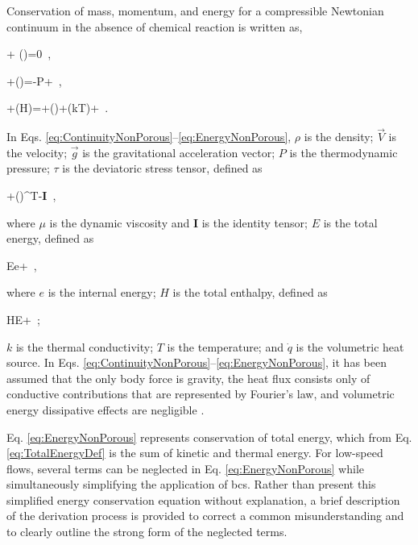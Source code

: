 Conservation of mass, momentum, and energy for a compressible Newtonian continuum in the absence of chemical reaction is written as,

\beq
\label{eq:ContinuityNonPorous}
 + \nabla\cdot(\rho{})=0\ ,
\eeq

\beq
\label{eq:NSFullForm}
+\nabla\cdot(\rho{})=\rho{}-\nabla P+\nabla\cdot\tau\ ,
\eeq

\beq
\label{eq:EnergyNonPorous}
+\nabla\cdot(\rho H)=\rho {}\cdot{}+\nabla\cdot(\tau)+\nabla\cdot(k\nabla T)+\ .
\eeq

\noindent In Eqs. \eqref{eq:ContinuityNonPorous}--\eqref{eq:EnergyNonPorous}, \(\rho\) is the density; \(\vec{V}\) is the velocity; \(\vec{g}\) is the gravitational acceleration vector; \(P\) is the thermodynamic pressure; \(\tau\) is the deviatoric stress tensor, defined as

\beq
\label{eq:TauDef}
\tau\equiv\mu\left\lbrack\nabla {}+(\nabla {})^T\right\rbrack-\nabla\cdot{}\textbf{I}\ ,
\eeq

\noindent where \(\mu\) is the dynamic viscosity and \(\textbf{I}\) is the identity tensor; \(E\) is the total energy, defined as

\beq
\label{eq:TotalEnergyDef}
E\equiv e+\cdot{}\ ,
\eeq

\noindent where \(e\) is the internal energy; \(H\) is the total enthalpy, defined as

\beq
\label{eq:TotalEnthalpyDef}
H\equiv E+\ ;
\eeq

\noindent \(k\) is the thermal conductivity; \(T\) is the temperature; and \(\dot{q}\) is the volumetric heat source. In Eqs. \eqref{eq:ContinuityNonPorous}--\eqref{eq:EnergyNonPorous}, it has been assumed that the only body force is gravity, the heat flux consists only of conductive contributions that are represented by Fourier's law, and volumetric energy dissipative effects are negligible \cite{batchelor}.

Eq. \eqref{eq:EnergyNonPorous} represents conservation of total energy, which from Eq. \eqref{eq:TotalEnergyDef} is the sum of kinetic and thermal energy. For low-speed flows, several terms can be neglected in Eq. \eqref{eq:EnergyNonPorous} while simultaneously simplifying the application of \glspl{bc}. Rather than present this simplified energy conservation equation without explanation, a brief description of the derivation process is provided to correct a common misunderstanding and to clearly outline the strong form of the neglected terms.

